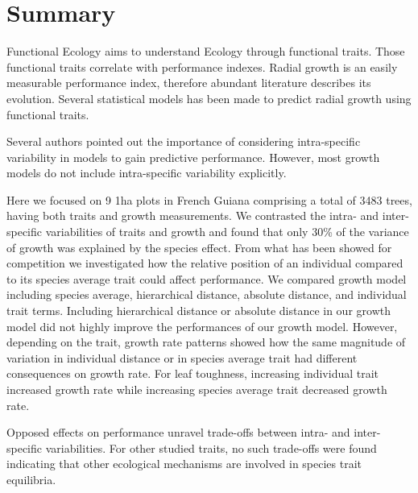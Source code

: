\section*{Summary}

Functional Ecology aims to understand Ecology through functional traits. Those functional traits correlate with performance indexes. Radial growth is an easily measurable performance index, therefore abundant literature describes its evolution. Several statistical models has been made to predict radial growth using functional traits.

Several authors pointed out the importance of considering intra-specific variability in models to gain predictive performance. However, most growth models do not include intra-specific variability explicitly.

Here we focused on 9 1ha plots in French Guiana comprising a total of 3483 trees, having both traits and growth measurements. We contrasted the intra- and inter-specific variabilities of traits and growth and found that only 30\% of the variance of growth was explained by the species effect. From what has been showed for competition we investigated how the relative position of an individual compared to its species average trait could affect performance. We compared growth model including species average, hierarchical distance, absolute distance, and individual trait terms. Including hierarchical distance or absolute distance in our growth model did not highly improve the performances of our growth model. However, depending on the trait, growth rate patterns showed how the same magnitude of variation in individual distance or in species average trait had different consequences on growth rate. For leaf toughness, increasing individual trait increased growth rate while increasing species average trait decreased growth rate. 

Opposed effects on performance unravel trade-offs between intra- and inter-specific variabilities. For other studied traits, no such trade-offs were found indicating that other ecological mechanisms are involved in species trait equilibria.
